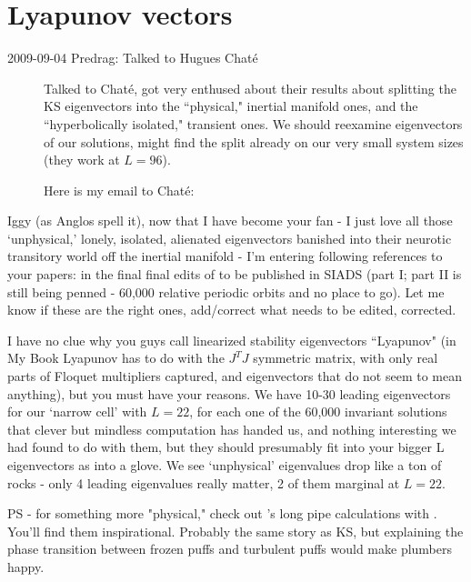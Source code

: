 
\chapter{Lyapunov vectors}
\label{s:LyapunovVec}

\begin{description}

\item[2009-09-04 Predrag: Talked to Hugues Chat\'{e}]
Talked to Chat\'{e}, got very
enthused about their results about splitting the KS
eigenvectors into the ``physical," inertial manifold ones,
and the ``hyperbolically isolated," transient ones. We should
reexamine eigenvectors of our solutions, might find the split
already on our very small system sizes (they work at $L=96$).

Here is my email to Chat\'{e}:

\end{description}

Iggy (as Anglos spell it),
%
now that I have become your fan - I just love all those
`unphysical,' lonely, isolated, alienated eigenvectors
banished into their neurotic transitory world off the
inertial manifold -  I'm entering following references to
your papers:
in the final final edits of to be published in SIADS (part I;
part II is still being penned - 60,000 relative periodic
orbits and no place to go). Let me know if these are the
right ones, add/correct what needs to be edited, corrected.

I have no clue why you guys call linearized stability
eigenvectors ``Lyapunov" (in My Book Lyapunov has to do with
the $J^T J$ symmetric matrix, with only real parts of Floquet
multipliers captured, and eigenvectors that do not seem to
mean anything), but you must have your reasons. We have 10-30
leading eigenvectors for our `narrow cell' with $L=22$, for
each one of the 60,000 invariant solutions that clever but
mindless computation has handed us, and nothing interesting
we had found to do with them, but they should presumably fit
into your bigger L eigenvectors as into a glove. We see
`unphysical' eigenvalues drop like a ton of rocks - only 4
leading eigenvalues really matter, 2 of them marginal at
$L=22$.

PS - for something more "physical," check out
's long pipe calculations with
.
You'll find them inspirational. Probably the same story as KS, but explaining the
phase transition between frozen puffs and turbulent puffs would make plumbers happy.


